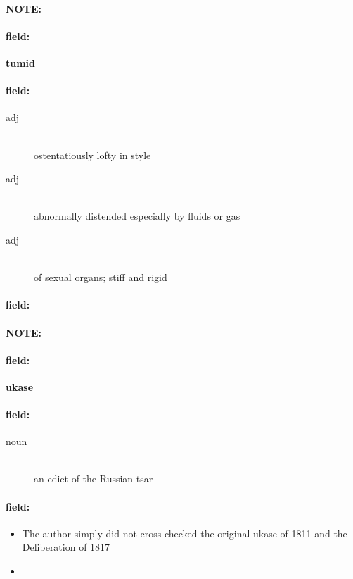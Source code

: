 \documentclass[12pt]{article}
\newenvironment{note}{\paragraph{NOTE:}}{}
\newenvironment{field}{\paragraph{field:}}{}
\begin{document}
\begin{note}
\begin{field}
\textbf{\large tumid}
\end{field}


\begin{field}
\begin{description}
\item[adj] \hfill \\ 
ostentatiously lofty in style

\item[adj] \hfill \\ 
abnormally distended especially by fluids or gas

\item[adj] \hfill \\ 
of sexual organs; stiff and rigid

\end{description}
\end{field}

\begin{field}
\end{field}
\end{note}
\begin{note}
\begin{field}
\textbf{\large ukase}
\end{field}


\begin{field}
\begin{description}
\item[noun] \hfill \\ 
an edict of the Russian tsar

\end{description}
\end{field}

\begin{field}
\begin{itemize}
\item The author simply did not cross checked the original ukase of 1811 and the Deliberation of 1817
\item 
\end{itemize}
\end{field}
\end{note}
\end{document}
